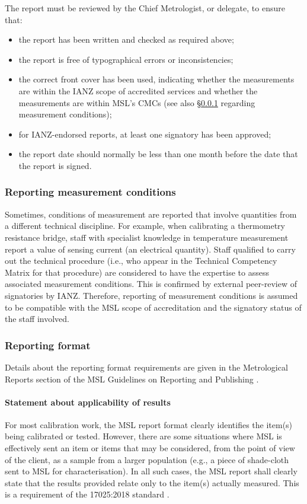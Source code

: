 The report must be reviewed by the Chief Metrologist, or delegate, to ensure that:
\begin{itemize}
\item the report has been written and checked as required above;
\item the report is free of typographical errors or inconsistencies;
\item the correct front cover has been used, indicating whether the measurements are within the IANZ scope of accredited services and whether the measurements are within MSL's CMCs (see also \S\ref{sss:measurement_conditions} regarding measurement conditions);
\item for IANZ-endorsed reports, at least one signatory has been approved;
\item the report date should normally be less than one month before the date that the report is signed.
\end{itemize} 

\subsubsection{Reporting measurement conditions}
\label{sss:measurement_conditions}
Sometimes, conditions of measurement are reported that involve quantities from a different technical discipline. For example, when calibrating a thermometry resistance bridge, staff with specialist knowledge in temperature measurement report a value of sensing current (an electrical quantity). Staff qualified to carry out the technical procedure (i.e., who appear in the Technical Competency Matrix for that procedure) are considered to have the expertise to assess associated measurement conditions. This is confirmed by external peer-review of signatories by IANZ. Therefore, reporting of measurement conditions is assumed to be compatible with the MSL scope of accreditation and the signatory status of the staff involved.

\subsubsection{Reporting format}
Details about the reporting format requirements are given in the Metrological Reports section of the MSL Guidelines on Reporting and Publishing \cite[\S\ref*{GRP-s:metrological_reports}]{MSL_Reporting_Guidelines}.

\paragraph{Statement about applicability of results}
For most calibration work, the MSL report format clearly identifies the item(s) being calibrated or tested. However, there are some situations where MSL is effectively sent an item or items that may be considered, from the point of view of the client, as a sample from a larger population (e.g., a piece of shade-cloth sent to MSL for characterisation). In all such cases, the MSL report shall clearly state that the results provided relate only to the item(s) actually measured. This is a requirement of the 17025:2018 standard \cite[clause 7.8.2.1~(l)]{ISO_17025}.      

